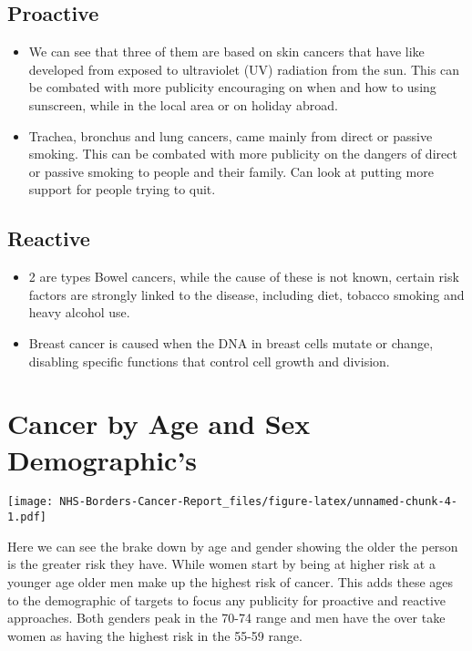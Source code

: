 \documentclass[
]{article}
\begin{document}
\hypertarget{proactive}{%
\subsection{Proactive}\label{proactive}}

\begin{itemize}
\item
  We can see that three of them are based on skin cancers that have like
  developed from exposed to ultraviolet (UV) radiation from the sun.
  This can be combated with more publicity encouraging on when and how
  to using sunscreen, while in the local area or on holiday abroad.
\item
  Trachea, bronchus and lung cancers, came mainly from direct or passive
  smoking. This can be combated with more publicity on the dangers of
  direct or passive smoking to people and their family. Can look at
  putting more support for people trying to quit.
\end{itemize}

\hypertarget{reactive}{%
\subsection{Reactive}\label{reactive}}

\begin{itemize}
\item
  2 are types Bowel cancers, while the cause of these is not known,
  certain risk factors are strongly linked to the disease, including
  diet, tobacco smoking and heavy alcohol use.
\item
  Breast cancer is caused when the DNA in breast cells mutate or change,
  disabling specific functions that control cell growth and division.
\end{itemize}

\hypertarget{cancer-by-age-and-sex-demographics}{%
\section{Cancer by Age and Sex
Demographic's}\label{cancer-by-age-and-sex-demographics}}

\texttt{[image: NHS-Borders-Cancer-Report\_files/figure-latex/unnamed-chunk-4-1.pdf]}

Here we can see the brake down by age and gender showing the older the
person is the greater risk they have. While women start by being at
higher risk at a younger age older men make up the highest risk of
cancer. This adds these ages to the demographic of targets to focus any
publicity for proactive and reactive approaches. Both genders peak in
the 70-74 range and men have the over take women as having the highest
risk in the 55-59 range.
\end{document}

